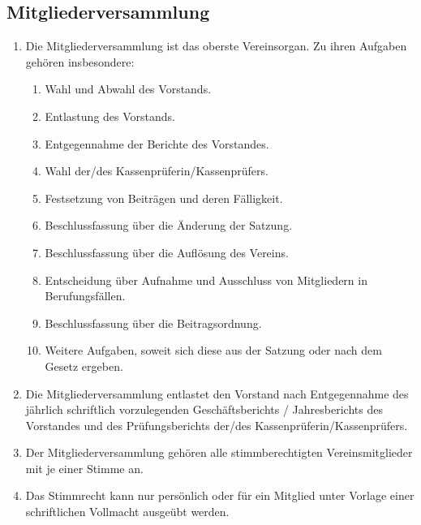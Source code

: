 \documentclass[12pt,a4paper,draft]{article}
\begin{document}
\subsection{Mitgliederversammlung} %
\begin{enumerate}
\item Die Mitgliederversammlung ist das oberste Vereinsorgan. Zu ihren Aufgaben 
gehören insbesondere:

\begin{enumerate}
\item Wahl und Abwahl des Vorstands. %

\item Entlastung des Vorstands.

\item Entgegennahme der Berichte des Vorstandes.

\item Wahl der/des Kassenprüferin/Kassenprüfers.

\item Festsetzung von Beiträgen und deren Fälligkeit.

\item Beschlussfassung über die Änderung der Satzung.

\item Beschlussfassung über die Auflösung des Vereins.

\item Entscheidung über Aufnahme und Ausschluss von Mitgliedern in 
Berufungsfällen.

\item Beschlussfassung über die Beitragsordnung.

\item Weitere Aufgaben, soweit sich diese aus der Satzung oder nach dem Gesetz 
ergeben.
\end{enumerate}

\item Die Mitgliederversammlung entlastet den Vorstand nach Entgegennahme des 
jährlich schriftlich vorzulegenden Geschäftsberichts / Jahresberichts des 
Vorstandes und des Prüfungsberichts der/des Kassenprüferin/Kassenprüfers.

\item Der Mitgliederversammlung gehören alle stimmberechtigten 
Vereinsmitglieder mit je einer Stimme an.

\item Das Stimmrecht kann nur persönlich oder für ein Mitglied unter Vorlage 
einer schriftlichen Vollmacht ausgeübt werden.


\end{enumerate}
\end{document}
